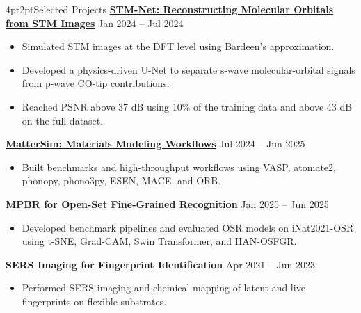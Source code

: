 \documentclass[10pt,a4paper]{article}
\makeatletter
\renewcommand\section{\@startsection{section}{1}{0pt}%
  {4pt}{2pt}{\large\bfseries\color{accent}}}
\makeatother
\begin{document}
\section{Selected Projects}
\textbf{\href{https://github.com/ZeHeru/STM_net/tree/main}{STM-Net: Reconstructing Molecular Orbitals from STM Images}}
\hfill\textcolor{muted}{Jan 2024 -- Jul 2024}
\begin{itemize}
  \item Simulated STM images at the DFT level using Bardeen's approximation.
  \item Developed a physics-driven U-Net to separate s-wave molecular-orbital signals from p-wave CO-tip contributions.
  \item Reached PSNR above 37 dB using 10\% of the training data and above 43 dB on the full dataset.
\end{itemize}

\textbf{\href{https://github.com/microsoft/mattersim}{MatterSim: Materials Modeling Workflows}}
\hfill\textcolor{muted}{Jul 2024 -- Jun 2025}
\begin{itemize}
  \item Built benchmarks and high-throughput workflows using VASP, atomate2, phonopy, phono3py, ESEN, MACE, and ORB.
\end{itemize}

\textbf{MPBR for Open-Set Fine-Grained Recognition}
\hfill\textcolor{muted}{Jan 2025 -- Jun 2025}
\begin{itemize}
  \item Developed benchmark pipelines and evaluated OSR models on iNat2021-OSR using t-SNE, Grad-CAM, Swin Transformer, and HAN-OSFGR.
\end{itemize}

\textbf{SERS Imaging for Fingerprint Identification}
\hfill\textcolor{muted}{Apr 2021 -- Jun 2023}
\begin{itemize}
  \item Performed SERS imaging and chemical mapping of latent and live fingerprints on flexible substrates.
\end{itemize}
\end{document}
